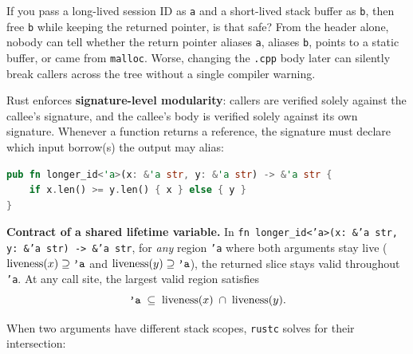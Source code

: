 If you pass a long-lived session ID as \texttt{a} and a short-lived stack buffer as \texttt{b}, then free \texttt{b} while keeping the returned pointer, is that safe? From the header alone, nobody can tell whether the return pointer aliases \texttt{a}, aliases \texttt{b}, points to a static buffer, or came from \texttt{malloc}. Worse, changing the \texttt{.cpp} body later can silently break callers across the tree without a single compiler warning.

Rust enforces \textbf{signature-level modularity}: callers are verified solely against the callee's signature, and the callee's body is verified solely against its own signature. Whenever a function returns a reference, the signature must declare which input borrow(s) the output may alias:

\begin{lstlisting}[language=Rust]
pub fn longer_id<'a>(x: &'a str, y: &'a str) -> &'a str {
    if x.len() >= y.len() { x } else { y }
}
\end{lstlisting}

\begin{formalbox}
\textbf{Contract of a shared lifetime variable.} In \texttt{fn longer\_id<'a>(x:\ \&'a str, y:\ \&'a str) -> \&'a str}, for \emph{any} region \texttt{'a} where both arguments stay live ($\mathrm{liveness}(x) \supseteq \text{\texttt{'a}}$ and $\mathrm{liveness}(y) \supseteq \text{\texttt{'a}}$), the returned slice stays valid throughout \texttt{'a}. At any call site, the largest valid region satisfies
\[
  \text{\texttt{'a}} \;\subseteq\; \mathrm{liveness}(x) \;\cap\; \mathrm{liveness}(y).
\]
\end{formalbox}

When two arguments have different stack scopes, \texttt{rustc} solves for their intersection:

